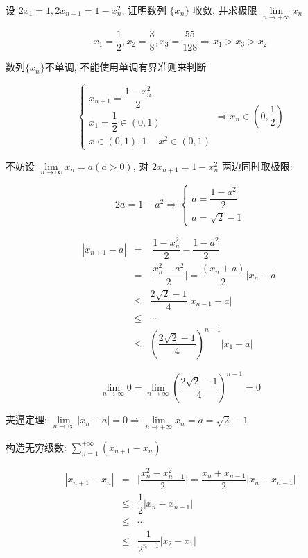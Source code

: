 \begin{proposition}
	设 $2x_{1}=1,2x_{n+1}=1-x_{n}^2$, 证明数列 $\{x_{n}\}$ 收敛,
	并求极限 $\lim\limits_{n\to +\infty}x_{n}$
\end{proposition}
\begin{solution}
	
	$$x_{1} = \dfrac{1}{2}, x_{2} = \dfrac{3}{8}, x_{3} = \dfrac{55}{128}\Rightarrow x_{1} > x_{3} > x_{2}$$
	
	数列$\{x_{n}\}$不单调, 不能使用单调有界准则来判断

	$$\begin{cases} 
		x_{n+1} = \dfrac{1-x_{n}^{2}}{2}\\
		x_{1} = \dfrac{1}{2}\in (0,1)\\
		x\in(0,1),1-x^{2}\in(0,1)
	\end{cases}\Rightarrow x_{n}\in (0,\dfrac{1}{2})$$
	\begin{anymark}[压缩映射原理]

		不妨设 $\lim\limits_{n\to\infty}x_{n}=a(a>0)$, 对 $2x_{n+1}=1-x_{n}^2$ 两边同时取极限: 
	    
		$$2a=1-a^2\Rightarrow 
		\begin{cases}
			a=\dfrac{1-a^2}{2} \\
			a=\sqrt{2}-1
		\end{cases}$$
			
		\begin{eqnarray*}
			|x_{n+1}-a| &  =   & \big|\dfrac{1-x_{n}^2}{2}-\dfrac{1-a^2}{2}\big|\\
					    &  =   & \big|\dfrac{x_{n}^{2}-a^2}{2}\big| = \dfrac{(x_{n}+a)}{2}|x_{n}-a|\\
					    & \leq & \dfrac{2\sqrt{2}-1}{4}|x_{n-1}-a|\\
					    & \leq & \cdots\\
					    & \leq & (\dfrac{2\sqrt{2}-1}{4})^{n-1}|x_{1}-a|
		\end{eqnarray*}
		
		$$\lim\limits_{n\to \infty} 0 = \lim\limits_{n\to \infty}(\dfrac{2\sqrt{2}-1}{4})^{n-1}=0$$
		
		夹逼定理: $\lim\limits_{n\to \infty}|x_{n}-a|=0 \Rightarrow \lim\limits_{n\to +\infty}x_{n} = a =\sqrt{2}-1$
	\end{anymark}
	\begin{anymark}[柯西列]

		构造无穷级数: $\sum\limits_{n=1}^{+\infty}(x_{n+1}-x_{n})$
		
		\begin{eqnarray*}
			|x_{n+1}-x_{n}| &   =  & \big|\dfrac{x_{n}^2-x_{n-1}^2}{2}\big| = \dfrac{x_{n}+x_{n-1}}{2}|x_{n}-x_{n-1}|\\
					  		& \leq & \dfrac{1}{2}|x_{n}-x_{n-1}|\\
					  		& \leq & \cdots\\
					  		& \leq & \dfrac{1}{2^{n-1}}|x_{2}-x_{1}|
		\end{eqnarray*}
		

\end{anymark}
\end{solution}
